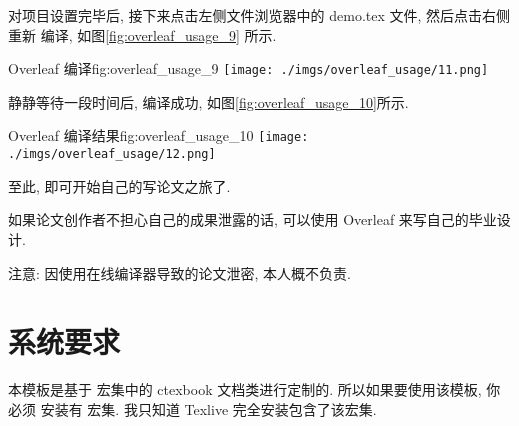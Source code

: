 \documentclass[bibsec, master, figtoc, tabtoc]{cugthesis}
\begin{document}
对项目设置完毕后, 接下来点击左侧文件浏览器中的 demo.tex 文件, 然后点击右侧重新
编译, 如图\ref{fig:overleaf_usage_9} 所示.

\begin{tfig}{Overleaf   编译}{fig:overleaf_usage_9}
\texttt{[image: ./imgs/overleaf\_usage/11.png]}
\end{tfig}

静静等待一段时间后, 编译成功, 如图\ref{fig:overleaf_usage_10}所示.

\begin{tfig}{Overleaf   编译结果}{fig:overleaf_usage_10}
\texttt{[image: ./imgs/overleaf\_usage/12.png]}
\end{tfig}

至此, 即可开始自己的写论文之旅了.

如果论文创作者不担心自己的成果泄露的话, 可以使用 Overleaf 来写自己的毕业设计.

注意: 因使用在线编译器导致的论文泄密, 本人概不负责.

\section{系统要求}
\label{sec:xi_tong_yao_qiu_}
本模板是基于 \CTeX{} 宏集中的 ctexbook 文档类进行定制的. 所以如果要使用该模板, 你必须
安装有 \CTeX{} 宏集. 我只知道 Texlive 完全安装包含了该宏集.
\end{document}
